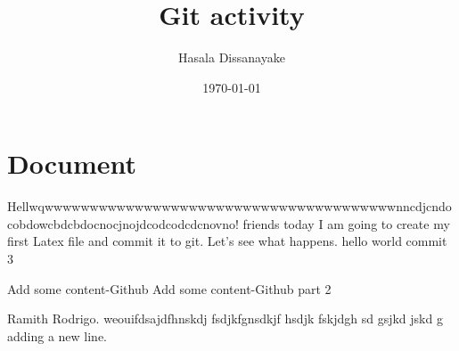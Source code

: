 \documentclass[a4 paper]{article}
\title{Git activity}
\author{Hasala Dissanayake}
\date{\today}
\begin{document}
\maketitle
\section{Document}

Hellwqwwwwwwwwwwwwwwwwwwwwwwwwwwwwwwwwwwwwwwwnncdjcndocobdowcbdcbdocnocjnojdcodcodcdcnovno! friends today I am going to create my first Latex file and commit it to git. Let's see what happens.
hello world
commit 3

Add some content-Github
Add some content-Github part 2

\newpage
Ramith Rodrigo. weouifdsajdfhnskdj fsdjkfgnsdkjf hsdjk fskjdgh sd gsjkd jskd g
adding a new line.
\end{document}
